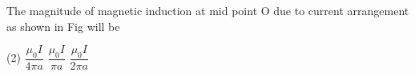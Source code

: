 \item The magnitude of magnetic induction at mid point O due to current arrangement as shown in Fig will be
    \begin{center}
    \end{center}
    \begin{tasks}(2)
        \task $\dfrac{\mu_0 I}{4 \pi a}$
        \task $\dfrac{\mu_0 I}{\pi a}$
        \task $\dfrac{\mu_0 I}{2 \pi a}$
    \end{tasks}